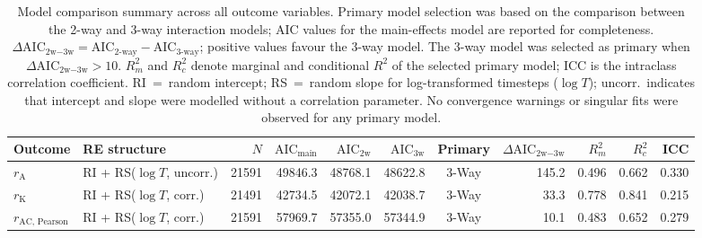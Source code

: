 \begin{table}[htbp]
  \centering
  \caption{%
    Model comparison summary across all outcome variables.
    Primary model selection was based on the comparison between the 2-way and 3-way
    interaction models; AIC values for the main-effects model are reported for completeness.
    $\Delta\text{AIC}_{\text{2w}-\text{3w}} = \text{AIC}_{\text{2-way}} - \text{AIC}_{\text{3-way}}$;
    positive values favour the 3-way model.
    The 3-way model was selected as primary when $\Delta\text{AIC}_{\text{2w}-\text{3w}} > 10$.
    $R^2_m$ and $R^2_c$ denote marginal and conditional $R^2$ \citep{Nakagawa2013}
    of the selected primary model; ICC is the intraclass correlation coefficient.
    RI~=~random intercept; RS~=~random slope for log-transformed timesteps ($\log T$);
    uncorr.\ indicates that intercept and slope were modelled without a correlation parameter.
    No convergence warnings or singular fits were observed for any primary model.
  }
  \label{tab:model_comparison}
  \begin{adjustbox}{max width=\textwidth}
  \begin{tabular}{@{}llrrrrcrrrr@{}}
    \toprule
    Outcome & RE structure & $N$ &
    $\text{AIC}_{\text{main}}$ & $\text{AIC}_{\text{2w}}$ & $\text{AIC}_{\text{3w}}$ &
    Primary & $\Delta\text{AIC}_{\text{2w}-\text{3w}}$ &
    $R^2_m$ & $R^2_c$ & ICC \\
    \midrule
    $r_{\text{A}}$ & RI + RS($\log T$, uncorr.) & 21591 & 49846.3 & 48768.1 & 48622.8 & 3-Way & 145.2 & 0.496 & 0.662 & 0.330 \\
    $r_{\text{K}}$ & RI + RS($\log T$, corr.) & 21491 & 42734.5 & 42072.1 & 42038.7 & 3-Way &  33.3 & 0.778 & 0.841 & 0.215 \\
    $r_{\text{AC, Pearson}}$ & RI + RS($\log T$, corr.) & 21591 & 57969.7 & 57355.0 & 57344.9 & 3-Way &  10.1 & 0.483 & 0.652 & 0.279 \\
    \bottomrule
  \end{tabular}
  \end{adjustbox}
\end{table}
